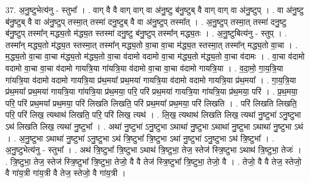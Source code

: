 \documentclass[17pt]{extarticle}
\begin{document}
37. अ॒नु॒ष्टुभेत्य॑नु - स्तुभा᳚ । . वाग् वै वै वाग् वाग् वा अ॑नु॒ष्टु ब॑नु॒ष्टुब् वै वाग् वाग् वा अ॑नु॒ष्टुप् । . वा अ॑नु॒ष्टु ब॑नु॒ष्टुब् वै वा अ॑नु॒ष्टुप् तस्मा॒त् तस्मा॑ दनु॒ष्टुब् वै वा अ॑नु॒ष्टुप् तस्मा᳚त् । . अ॒नु॒ष्टुप् तस्मा॒त् तस्मा॑ दनु॒ष्टु ब॑नु॒ष्टुप् तस्मा᳚न् मद्ध्य॒तो म॑द्ध्य॒त स्तस्मा॑ दनु॒ष्टु ब॑नु॒ष्टुप् तस्मा᳚न् मद्ध्य॒तः । . अ॒नु॒ष्टुबित्य॑नु - स्तुप् । . तस्मा᳚न् मद्ध्य॒तो म॑द्ध्य॒त स्तस्मा॒त् तस्मा᳚न् मद्ध्य॒तो वा॒चा वा॒चा म॑द्ध्य॒त स्तस्मा॒त् तस्मा᳚न् मद्ध्य॒तो वा॒चा । . म॒द्ध्य॒तो वा॒चा वा॒चा म॑द्ध्य॒तो म॑द्ध्य॒तो वा॒चा व॑दामो वदामो वा॒चा म॑द्ध्य॒तो म॑द्ध्य॒तो वा॒चा व॑दामः । . वा॒चा व॑दामो वदामो वा॒चा वा॒चा व॑दामो गायत्रि॒या गा॑यत्रि॒या व॑दामो वा॒चा वा॒चा व॑दामो गायत्रि॒या । . व॒दा॒मो॒ गा॒य॒त्रि॒या गा॑यत्रि॒या व॑दामो वदामो गायत्रि॒या प्र॑थ॒मया᳚ प्रथ॒मया॑ गायत्रि॒या व॑दामो वदामो गायत्रि॒या प्र॑थ॒मया᳚ । . गा॒य॒त्रि॒या प्र॑थ॒मया᳚ प्रथ॒मया॑ गायत्रि॒या गा॑यत्रि॒या प्र॑थ॒मया॒ परि॒ परि॑ प्रथ॒मया॑ गायत्रि॒या गा॑यत्रि॒या प्र॑थ॒मया॒ परि॑ । . प्र॒थ॒मया॒ परि॒ परि॑ प्रथ॒मया᳚ प्रथ॒मया॒ परि॑ लिखति लिखति॒ परि॑ प्रथ॒मया᳚ प्रथ॒मया॒ परि॑ लिखति । . परि॑ लिखति लिखति॒ परि॒ परि॑ लिख॒ त्यथाथ॑ लिखति॒ परि॒ परि॑ लिख॒ त्यथ॑ । . लि॒ख॒ त्यथाथ॑ लिखति लिख॒ त्यथा॑ नु॒ष्टुभा॑ ऽनु॒ष्टुभा ऽथ॑ लिखति लिख॒ त्यथा॑ नु॒ष्टुभा᳚ । . अथा॑ नु॒ष्टुभा॑ ऽनु॒ष्टुभा ऽथाथा॑ नु॒ष्टुभा ऽथाथा॑ नु॒ष्टुभा ऽथाथा॑ नु॒ष्टुभा ऽथ॑ । . अ॒नु॒ष्टुभा ऽथाथा॑ नु॒ष्टुभा॑ ऽनु॒ष्टुभा ऽथ॑ त्रि॒ष्टुभा᳚ त्रि॒ष्टुभा ऽथा॑ नु॒ष्टुभा॑ ऽनु॒ष्टुभा ऽथ॑ त्रि॒ष्टुभा᳚ । . अ॒नु॒ष्टुभेत्य॑नु - स्तुभा᳚ । . अथ॑ त्रि॒ष्टुभा᳚ त्रि॒ष्टुभा ऽथाथ॑ त्रि॒ष्टुभा॒ तेज॒ स्तेज॑ स्त्रि॒ष्टुभा ऽथाथ॑ त्रि॒ष्टुभा॒ तेजः॑ । . त्रि॒ष्टुभा॒ तेज॒ स्तेज॑ स्त्रि॒ष्टुभा᳚ त्रि॒ष्टुभा॒ तेजो॒ वै वै तेज॑ स्त्रि॒ष्टुभा᳚ त्रि॒ष्टुभा॒ तेजो॒ वै । . तेजो॒ वै वै तेज॒ स्तेजो॒ वै गा॑य॒त्री गा॑य॒त्री वै तेज॒ स्तेजो॒ वै गा॑य॒त्री । \newline
\end{document}

